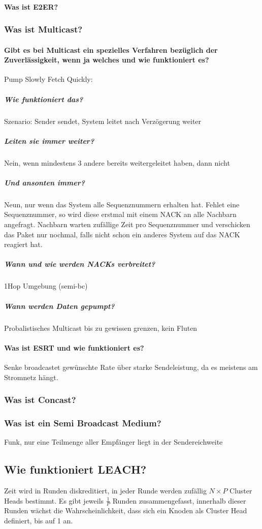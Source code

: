 			\paragraph{Was ist E2ER?}
		\subsubsection{Was ist Multicast?}
		\paragraph{Gibt es bei Multicast ein spezielles Verfahren bezüglich der Zuverlässigkeit, wenn ja welches und wie funktioniert es?}
			Pump Slowly Fetch Quickly: %
			\subparagraph{Wie funktioniert das?}
			Szenario: Sender sendet, System leitet nach Verzögerung weiter
			\subparagraph{Leiten sie immer weiter?}
			Nein, wenn mindestens 3 andere bereits weitergeleitet haben, dann nicht
			\subparagraph{Und ansonten immer?}
			Neun, nur wenn das System alle Sequenznummern erhalten hat. Fehlet eine Sequenznummer, so wird diese erstmal mit einem NACK an alle Nachbarn angefragt. Nachbarn warten zufällige Zeit pro Sequenznummer und verschicken das Paket nur nochmal, falls nicht schon ein anderes System auf das NACK reagiert hat.
			\subparagraph{Wann und wie werden NACKs verbreitet?} 1Hop Umgebung (semi-bc)
			\subparagraph{Wann werden Daten gepumpt?} Probalistisches Multicast bis zu gewissen grenzen, kein Fluten
		\paragraph{Was ist ESRT und wie funktioniert es?}
		Senke broadcastet gewünschte Rate über starke Sendeleistung, da es meistens am Stromnetz hängt.
			
		\subsubsection{Was ist Concast?}
		
		\subsubsection{Was ist ein Semi\- Broadcast Medium?}
		Funk, nur eine Teilmenge aller Empfänger liegt in der Sendereichweite
		
	\subsection{Wie funktioniert LEACH?}
	Zeit wird in Runden diskreditiert, in jeder Runde werden zufällig $N \times P$ Cluster\- Heads bestimmt.
	Es gibt jeweils $\frac{1}{P}$ Runden zusammengefasst, innerhalb dieser Runden wächst die Wahrscheinlichkeit, dass sich ein Knoden als Cluster\- Head definiert, bis auf 1 an. 
	
